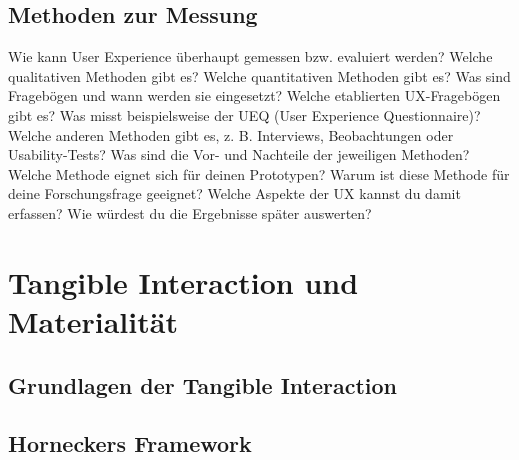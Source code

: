 \subsection{Methoden zur Messung}
Wie kann User Experience überhaupt gemessen bzw. evaluiert werden?
Welche qualitativen Methoden gibt es?
Welche quantitativen Methoden gibt es?
Was sind Fragebögen und wann werden sie eingesetzt?
Welche etablierten UX-Fragebögen gibt es?
Was misst beispielsweise der UEQ (User Experience Questionnaire)?
Welche anderen Methoden gibt es, z. B. Interviews, Beobachtungen oder Usability-Tests?
Was sind die Vor- und Nachteile der jeweiligen Methoden?
Welche Methode eignet sich für deinen Prototypen?
Warum ist diese Methode für deine Forschungsfrage geeignet?
Welche Aspekte der UX kannst du damit erfassen?
Wie würdest du die Ergebnisse später auswerten?

\section{Tangible Interaction und Materialität}
\subsection{Grundlagen der Tangible Interaction}
\subsection{Horneckers Framework}
